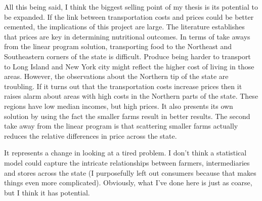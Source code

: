 \documentclass{report}
\begin{document}
All this being said, I think the biggest selling point of my thesis is its potential to be expanded. If the link between transportation costs and prices could be better cemented, the implications of this project are large. The literature establishes that prices are key in determining nutritional outcomes. In terms of take aways from the linear program solution, transporting food to the Northeast and Southeastern corners of the state is difficult. Produce being harder to transport to Long Island and New York city might reflect the higher cost of living in those areas. However, the observations about the Northern tip of the state are troubling. If it turns out that the transportation costs increase prices then it raises alarm about areas with high costs in the Northern parts of the state. These regions have low median incomes, but high prices. It also presents its own solution by using the fact the smaller farms result in better results. The second take away from the linear program is that scattering smaller farms actually reduces the relative differences in price across the state.

It represents a change in looking at a tired problem. I don't think a statistical model could capture the intricate relationships between farmers, intermediaries and stores across the state (I purposefully left out consumers because that makes things even more complicated). Obviously, what I've done here is just as coarse, but I think it has potential.

\pagebreak
\end{document}
